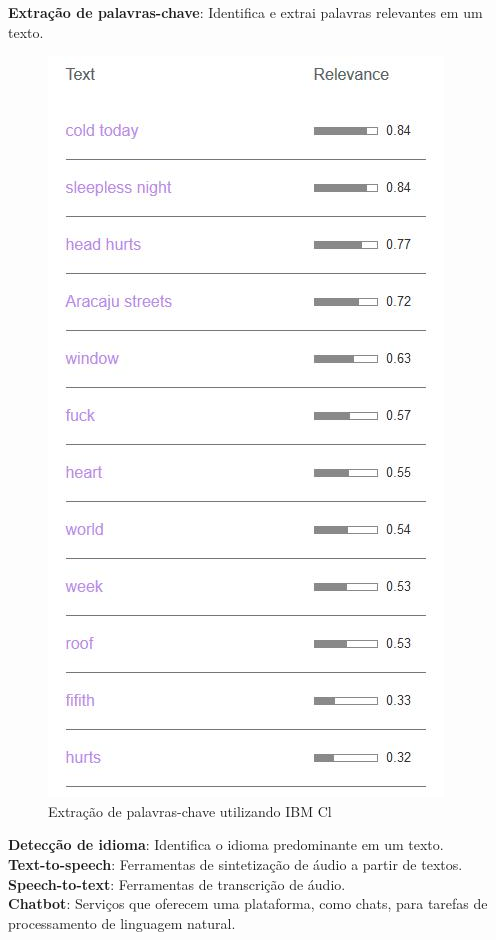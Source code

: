 \documentclass{article}
\begin{document}
\textbf{Extração de palavras-chave}: Identifica e extrai palavras relevantes em um texto. \\
\begin{figure}[H]
    \centering
    \includegraphics[scale=0.5]{imagens/nlp_extracao_keywords.jpg}
    \caption{Extração de palavras-chave utilizando IBM Cl}
    \label{fig:nlp_keywords}
\end{figure}{}
\textbf{Detecção de idioma}: Identifica o idioma predominante em um texto. \\
\textbf{Text-to-speech}: Ferramentas de sintetização de áudio a partir de textos. \\
\textbf{Speech-to-text}: Ferramentas de transcrição de áudio. \\
\textbf{Chatbot}: Serviços que oferecem uma plataforma, como chats, para tarefas de processamento de linguagem natural. \\
\end{document}
